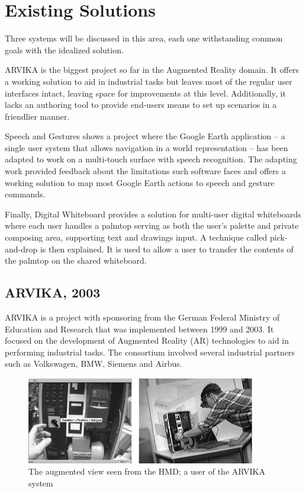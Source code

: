 \section{Existing Solutions}



Three systems will be discussed in this area, each one 
withstanding common goals with the idealized solution.

ARVIKA is the biggest project so far in the
Augmented Reality domain. It offers a working solution to aid in industrial tasks but leaves most
of the regular user interfaces intact, leaving space for improvements at this level.
Additionally, it lacks an authoring tool to provide end-users means to set up scenarios in a friendlier manner.

Speech and Gestures shows a project where the Google Earth \cite{SITE-EARTH} application
-- a single user system that allows navigation in a world representation -- has been adapted to
work on a multi-touch surface with speech recognition.
The adapting work provided feedback about the limitations such software faces 
and offers a working solution to map most Google Earth actions to speech and gesture commands.

Finally, Digital Whiteboard provides a solution for multi-user digital
whiteboards where each user handles a palmtop serving as both the user's palette and
private composing area, supporting text and drawings input.
A technique called pick-and-drop is then explained. It is used to allow a user to transfer
the contents of the palmtop on the shared whiteboard.



\subsection{ARVIKA, 2003}

ARVIKA \cite{ARVIKA} is a project with sponsoring from the
German Federal Ministry of Education and Research that was implemented between 1999 and 2003.
It focused on the development of Augmented Reality (AR) technologies to aid in performing industrial tasks.
The consortium involved several industrial partners such as Volkswagen, BMW, Siemens and Airbus.

\begin{figure}[!ht]
    \centering
    \includegraphics[width=10cm]{gfx/arvika.png}
    \caption{The augmented view seen from the HMD; a user of the ARVIKA system}
    \label{FIG-ARVIKA}
\end{figure}

